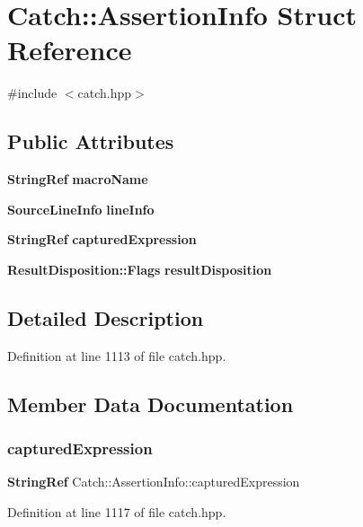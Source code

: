 \section{Catch\+::Assertion\+Info Struct Reference}
\label{struct_catch_1_1_assertion_info}


{\ttfamily \#include $<$catch.\+hpp$>$}

\subsection*{Public Attributes}
\begin{DoxyCompactItemize}
\item 
\textbf{ String\+Ref} \textbf{ macro\+Name}
\item 
\textbf{ Source\+Line\+Info} \textbf{ line\+Info}
\item 
\textbf{ String\+Ref} \textbf{ captured\+Expression}
\item 
\textbf{ Result\+Disposition\+::\+Flags} \textbf{ result\+Disposition}
\end{DoxyCompactItemize}


\subsection{Detailed Description}


Definition at line 1113 of file catch.\+hpp.



\subsection{Member Data Documentation}
\mbox{\label{struct_catch_1_1_assertion_info_accd36744b4acaa3a691a72df0b42190f}} 
\subsubsection{capturedExpression}
{\footnotesize\ttfamily \textbf{ String\+Ref} Catch\+::\+Assertion\+Info\+::captured\+Expression}



Definition at line 1117 of file catch.\+hpp.

\mbox{\label{struct_catch_1_1_assertion_info_a17bdbb404ba12658034f833be2f4c3e7}} 
